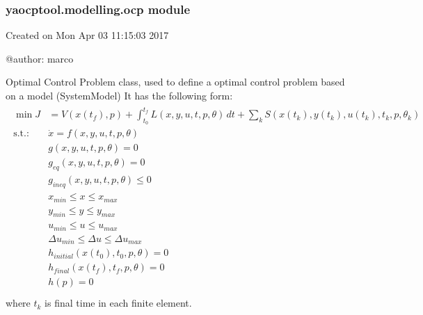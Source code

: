 \documentclass[letterpaper,10pt,english]{sphinxmanual}
\begin{document}
\subsubsection{yaocptool.modelling.ocp module}
\label{\detokenize{yaocptool.modelling:module-yaocptool.modelling.ocp}}\label{\detokenize{yaocptool.modelling:yaocptool-modelling-ocp-module}}
Created on Mon Apr 03 11:15:03 2017

@author: marco

\begin{fulllineitems}
\label{\detokenize{yaocptool.modelling:yaocptool.modelling.ocp.OptimalControlProblem}}
Optimal Control Problem class, used to define a optimal control problem based on a model (SystemModel)
It has the following form:
\begin{align*}\!\begin{aligned}
\min J &= V(x(t_f), p) + \int_{t_0} ^{t_f} L(x,y,u,t,p,\theta) \, dt
 + \sum_{k} S(x(t_k), y(t_k), u(t_k), t_k, p, \theta_k)\\
\textrm{s.t.:}\,& \dot{x} = f(x,y,u,t,p,\theta)\\
& g(x,y,u,t,p,\theta) = 0\\
& g_{eq} (x,y,u,t,p,\theta) = 0\\
& g_{ineq}(x,y,u,t,p,\theta) \leq 0\\
& x_{min} \leq x \leq x_{max}\\
& y_{min} \leq y \leq y_{max}\\
& u_{min} \leq u \leq u_{max}\\
& \Delta u_{min} \leq \Delta u \leq \Delta u_{max}\\
& h_{initial} (x (t_0), t_0, p, \theta) = 0\\
& h_{final} (x (t_f), t_f, p, \theta) = 0\\
& h (p) = 0\\
\end{aligned}\end{align*}
where  \(t_k\) is final time in each finite element.

\begin{fulllineitems}
\label{\detokenize{yaocptool.modelling:yaocptool.modelling.ocp.OptimalControlProblem.__init__}}
\end{fulllineitems}


\end{fulllineitems}
\end{document}
